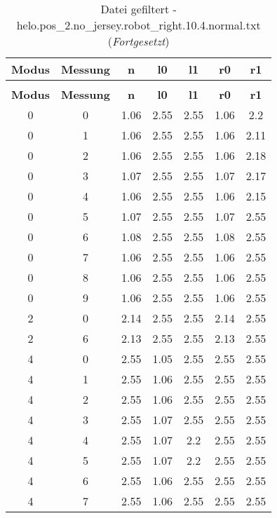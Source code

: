 \clearpage{}
\begin{longtable}{|c|c||c||c|c||c|c|}
	\caption{Datei gefiltert - helo.pos\_2.no\_jersey.robot\_right.10.4.normal.txt} \label{tab:helo.pos-2.no-jersey.robot-right.10.4.normal.txt} \\ \hline
	\textbf{Modus} & \textbf{Messung} & \textbf{n} & \textbf{l0} & \textbf{l1} & \textbf{r0} & \textbf{r1}\\ \hline
	\endfirsthead
	\caption[]{Datei gefiltert - helo.pos\_2.no\_jersey.robot\_right.10.4.normal.txt (\emph{Fortgesetzt})} \\ \hline
	\textbf{Modus} & \textbf{Messung} & \textbf{n} & \textbf{l0} & \textbf{l1} & \textbf{r0} & \textbf{r1}\\ \hline
	\endhead
	0 & 0 & 1.06 & 2.55 & 2.55 & 1.06 & 2.2 \\ \hline
	0 & 1 & 1.06 & 2.55 & 2.55 & 1.06 & 2.11 \\ \hline
	0 & 2 & 1.06 & 2.55 & 2.55 & 1.06 & 2.18 \\ \hline
	0 & 3 & 1.07 & 2.55 & 2.55 & 1.07 & 2.17 \\ \hline
	0 & 4 & 1.06 & 2.55 & 2.55 & 1.06 & 2.15 \\ \hline
	0 & 5 & 1.07 & 2.55 & 2.55 & 1.07 & 2.55 \\ \hline
	0 & 6 & 1.08 & 2.55 & 2.55 & 1.08 & 2.55 \\ \hline
	0 & 7 & 1.06 & 2.55 & 2.55 & 1.06 & 2.55 \\ \hline
	0 & 8 & 1.06 & 2.55 & 2.55 & 1.06 & 2.55 \\ \hline
	0 & 9 & 1.06 & 2.55 & 2.55 & 1.06 & 2.55 \\ \hline
	2 & 0 & 2.14 & 2.55 & 2.55 & 2.14 & 2.55 \\ \hline
	2 & 6 & 2.13 & 2.55 & 2.55 & 2.13 & 2.55 \\ \hline
	4 & 0 & 2.55 & 1.05 & 2.55 & 2.55 & 2.55 \\ \hline
	4 & 1 & 2.55 & 1.06 & 2.55 & 2.55 & 2.55 \\ \hline
	4 & 2 & 2.55 & 1.06 & 2.55 & 2.55 & 2.55 \\ \hline
	4 & 3 & 2.55 & 1.07 & 2.55 & 2.55 & 2.55 \\ \hline
	4 & 4 & 2.55 & 1.07 & 2.2 & 2.55 & 2.55 \\ \hline
	4 & 5 & 2.55 & 1.07 & 2.2 & 2.55 & 2.55 \\ \hline
	4 & 6 & 2.55 & 1.06 & 2.55 & 2.55 & 2.55 \\ \hline
	4 & 7 & 2.55 & 1.06 & 2.55 & 2.55 & 2.55 \\ \hline

\end{longtable}
